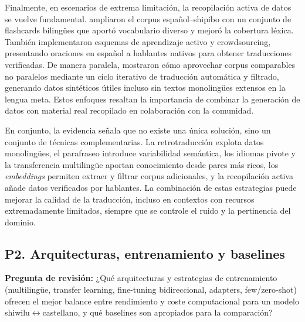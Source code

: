 \documentclass[12pt,a4paper,oneside]{book}
\begin{document}
Finalmente, en escenarios de extrema limitación, la recopilación activa de datos se vuelve fundamental. \textcite{montoya2019} ampliaron el corpus español--shipibo con un conjunto de flashcards bilingües que aportó vocabulario diverso y mejoró la cobertura léxica. También implementaron esquemas de aprendizaje activo y crowdsourcing, presentando oraciones en español a hablantes nativos para obtener traducciones verificadas. De manera paralela, \textcite{yamamoto2023} mostraron cómo aprovechar corpus comparables no paralelos mediante un ciclo iterativo de traducción automática y filtrado, generando datos sintéticos útiles incluso sin textos monolingües extensos en la lengua meta. Estos enfoques resaltan la importancia de combinar la generación de datos con material real recopilado en colaboración con la comunidad.

En conjunto, la evidencia señala que no existe una única solución, sino un conjunto de técnicas complementarias. La retrotraducción explota datos monolingües, el parafraseo introduce variabilidad semántica, los idiomas pivote y la transferencia multilingüe aportan conocimiento desde pares más ricos, los \emph{embeddings} permiten extraer y filtrar corpus adicionales, y la recopilación activa añade datos verificados por hablantes. La combinación de estas estrategias puede mejorar la calidad de la traducción, incluso en contextos con recursos extremadamente limitados, siempre que se controle el ruido y la pertinencia del dominio.

\subsection{P2. Arquitecturas, entrenamiento y baselines}\label{quuxe9-arquitecturas-y-estrategias-de-entrenamiento-multilinguxfce-transfer-learning-fine-tuning-bidireccional-adapters-fewzero-shot-ofrecen-el-mejor-balance-entre-rendimiento-y-coste-computacional-para-un-modelo-shiwilucastellano-y-quuxe9-baselines-son-apropiados-para-la-comparaciuxf3n}

\noindent\textbf{Pregunta de revisión:} ¿Qué arquitecturas y estrategias de entrenamiento (multilingüe, transfer learning, fine-tuning bidireccional, adapters, few/zero-shot) ofrecen el mejor balance entre rendimiento y coste computacional para un modelo shiwilu$\leftrightarrow$castellano, y qué baselines son apropiados para la comparación?
\end{document}
